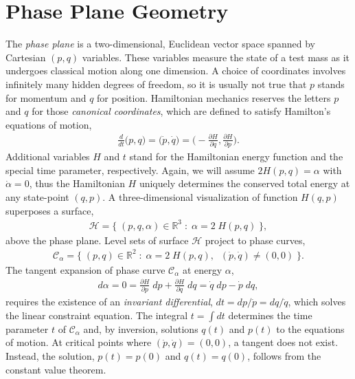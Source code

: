 \documentclass[nofootinbib,preprint]{revtex4-1}
\begin{document}



\section{Phase Plane Geometry}

The \textit{phase plane} is a two-dimensional, Euclidean vector space spanned by 
Cartesian $(p,q)$ variables. These variables measure the state of a test mass as it 
undergoes classical motion along one dimension. A choice of coordinates involves infinitely
many hidden degrees of freedom, so it is usually not true that $p$ stands for momentum and 
$q$ for position. Hamiltonian mechanics reserves the letters $p$ and $q$ for those 
\textit{canonical coordinates}, which are defined to satisfy Hamilton's equations of motion,
\begin{eqnarray}
\frac{d}{dt}\Big(p,q\Big)= \Big(\dot{p},\dot{q}\Big) 
= \bigg(-\frac{\partial H }{\partial q}, \frac{\partial H}{\partial p} \bigg). \nonumber
\end{eqnarray}
Additional variables $H$ and $t$ stand for the Hamiltonian energy function and the special
time parameter, respectively. Again, we will assume $2H(p,q)=\alpha$ 
with $\dot{\alpha} = 0$, thus the Hamiltonian $H$ uniquely determines the conserved total 
energy at any state-point $(q,p)$. A three-dimensional visualization of function $H(q,p)$ 
superposes a surface,
\begin{eqnarray}
\mathcal{H} = \{ \; (p,q,\alpha) \in \mathbb{R}^3 \; : \; \alpha = 2\;H(p,q) \; \}, \nonumber
\end{eqnarray}
above the phase plane. Level sets of surface $\mathcal{H}$ project to phase 
curves,
\begin{eqnarray}
\mathcal{C}_{\alpha} = \{ \; (p,q) \in \mathbb{R}^2 \; : \; \alpha = 2\;H(p,q), \;\; (\dot{p},\dot{q})\neq(0,0) \; \}. \nonumber
\end{eqnarray}
The tangent expansion of phase curve $\mathcal{C}_{\alpha}$ at energy $\alpha$, 
\begin{eqnarray}
d\alpha = 0 = \frac{\partial H}{\partial p}\;dp+\frac{\partial H}{\partial q}\;dq = \dot{q}\;dp-\dot{p}\;dq, \nonumber
\end{eqnarray}
requires the existence of an \textit{invariant differential}, $dt = dp/\dot{p} = dq/\dot{q}$,
which solves the linear constraint equation. The integral $t=\int dt$ determines the time parameter 
$t$ of $\mathcal{C}_{\alpha}$ and, by inversion, solutions $q(t)$ and $p(t)$ to the equations of motion. 
At critical points where $(\dot{p},\dot{q})=(0,0)$, a tangent does not exist. Instead, the solution,  
$p(t)=p(0)$ and $q(t)=q(0)$, follows from the constant value theorem. 
 
\end{document}

